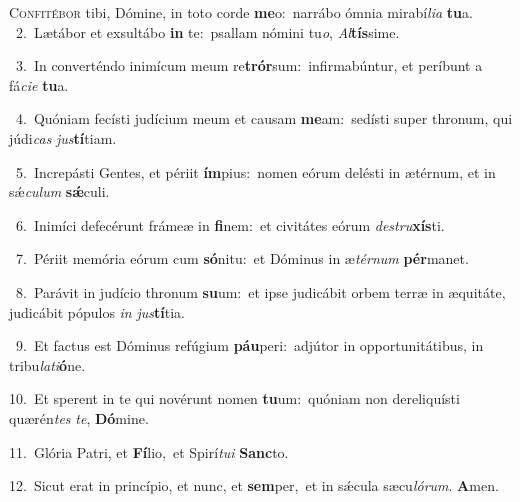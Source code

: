 \lettrine{\initial\textcolor{\initialcolor}{C}}{onfitébor} tibi, Dómine, in toto corde \textbf{me}\-o:~\star narrábo ómnia mirabí\-\textit{li}\-\textit{a} \textbf{tu}\-a.\\
{\numbfont\textcolor{\numbcolor}{~2.}}~Lætábor et exsultábo \textbf{in} te:~\star psallam nómini tu\-\textit{o}\-, \textit{Al}\-\textbf{tís}sime.\par
{\numbfont\textcolor{\numbcolor}{~3.}}~In converténdo inimícum meum re\-\textbf{trór}\-sum:~\star infirmabúntur, et períbunt a fá\-\textit{ci}\-\textit{e} \textbf{tu}\-a.\par
{\numbfont\textcolor{\numbcolor}{~4.}}~Quóniam fecísti judícium meum et causam \textbf{me}\-am:~\star sedísti super thronum, qui júdi\textit{cas} \textit{jus}\-\textbf{tí}tiam.\par
{\numbfont\textcolor{\numbcolor}{~5.}}~Increpásti Gentes, et périit \textbf{ím}\-pius:~\star nomen eórum delésti in ætérnum, et in sǽ\-\textit{cu}\-\textit{lum} \textbf{sǽ}\-culi.\par
{\numbfont\textcolor{\numbcolor}{~6.}}~Inimíci defecérunt frámeæ in \textbf{fi}\-nem:~\star et civitátes eórum \textit{de}\-\textit{stru}\textbf{xís}ti.\par
{\numbfont\textcolor{\numbcolor}{~7.}}~Périit memória eórum cum \textbf{só}\-nitu:~\star et Dóminus in æ\-\textit{tér}\-\textit{num} \textbf{pér}\-manet.\par
{\numbfont\textcolor{\numbcolor}{~8.}}~Parávit in judício thronum \textbf{su}\-um:~\star et ipse judicábit orbem terræ in æquitáte, judicábit pópulos \textit{in} \textit{jus}\-\textbf{tí}tia.\par
{\numbfont\textcolor{\numbcolor}{~9.}}~Et factus est Dóminus refúgium \textbf{páu}\-peri:~\star adjútor in opportunitátibus, in tribu\-\textit{la}\-\textit{ti}\textbf{ó}ne.\par
{\numbfont\textcolor{\numbcolor}{10.}}~Et sperent in te qui novérunt nomen \textbf{tu}\-um:~\star quóniam non dereliquísti quærén\textit{tes} \textit{te}\-, \textbf{Dó}\-mine.\par
{\numbfont\textcolor{\numbcolor}{11.}}~Glória Patri, et \textbf{Fí}\-lio,~\star et Spirí\-\textit{tu}\-\textit{i} \textbf{Sanc}\-to.\par
{\numbfont\textcolor{\numbcolor}{12.}}~Sicut erat in princípio, et nunc, et \textbf{sem}\-per,~\star et in sǽcula sæcu\-\textit{ló}\-\textit{rum}. \textbf{A}\-men.\par
